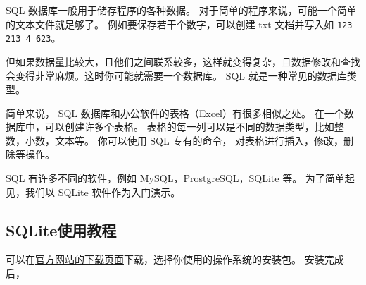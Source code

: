 
SQL 数据库一般用于储存程序的各种数据。 对于简单的程序来说，可能一个简单的文本文件就足够了。 例如要保存若干个数字，可以创建 txt 文档并写入如 \verb|123 213 4 623|。

但如果数据量比较大，且他们之间联系较多，这样就变得复杂，且数据修改和查找会变得非常麻烦。这时你可能就需要一个数据库。 SQL 就是一种常见的数据库类型。

简单来说， SQL 数据库和办公软件的表格（Excel）有很多相似之处。 在一个数据库中，可以创建许多个表格。 表格的每一列可以是不同的数据类型，比如整数，小数，文本等。 你可以使用 SQL 专有的命令， 对表格进行插入，修改，删除等操作。

SQL 有许多不同的软件，例如 MySQL，ProstgreSQL，SQLite 等。 为了简单起见，我们以 SQLite 软件作为入门演示。
\subsection{SQLite使用教程}

可以在\href{https://sqlitebrowser.org/dl/}{官方网站的下载页面}下载，选择你使用的操作系统的安装包。 安装完成后，







